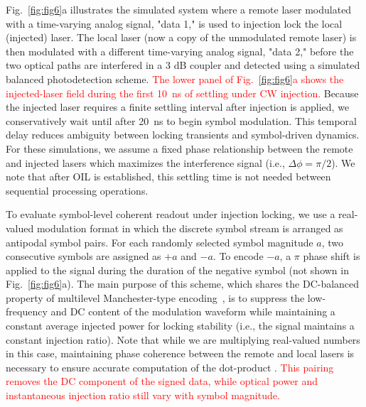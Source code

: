 \documentclass[%
 aip,
 apl,
 amsmath,amssymb,
 reprint,%
 floatfix,
]{revtex4-1}
\newcommand{\reviewreplace}[2]{\textcolor{red}{#2}}
\begin{document}
Fig.~\ref{fig:fig6}a illustrates the simulated system where a remote laser modulated with a time-varying analog signal, "data 1," is used to injection lock the local (injected) laser. The local laser (now a copy of the unmodulated remote laser) is then modulated with a different time-varying analog signal, "data 2," before the two optical paths are interfered in a 3 dB coupler and detected using a simulated balanced photodetection scheme. \reviewreplace{The plot in Fig.~\ref{fig:fig6}a shows the remote laser field amplitude in the time domain over the first 10~ns immediately after OIL starts.}{The lower panel of Fig.~\ref{fig:fig6}a shows the injected-laser field during the first 10~ns of settling under CW injection.} Because the injected laser requires a finite settling interval after injection is applied, we conservatively wait until after 20~ns to begin symbol modulation. This temporal delay reduces ambiguity between locking transients and symbol-driven dynamics. For these simulations, we assume a fixed phase relationship between the remote and injected lasers which maximizes the interference signal (i.e., $\Delta\phi = \pi/2$). We note that after OIL is established, this settling time is not needed between sequential processing operations.

To evaluate symbol-level coherent readout under injection locking, we use a real-valued modulation format in which the discrete symbol stream is arranged as antipodal symbol pairs. For each randomly selected symbol magnitude $a$, two consecutive symbols are assigned as $+a$ and $-a$. To encode $-a$, a $\pi$ phase shift is applied to the signal during the duration of the negative symbol (not shown in Fig.~\ref{fig:fig6}a). The main purpose of this scheme, which shares the DC-balanced property of multilevel Manchester-type encoding~\cite{Chung2012EMC_PAMn}, is to suppress the low-frequency and DC content of the modulation waveform while maintaining a constant average injected power for locking stability (i.e., the signal maintains a constant injection ratio). Note that while we are multiplying real-valued numbers in this case, maintaining phase coherence between the remote and local lasers is necessary to ensure accurate computation of the dot-product \cite{Hamerly2019PRX_PhotoelectricMultiplication}.
\textcolor{red}{This pairing removes the DC component of the signed data, while optical power and instantaneous injection ratio still vary with symbol magnitude.}
\end{document}
